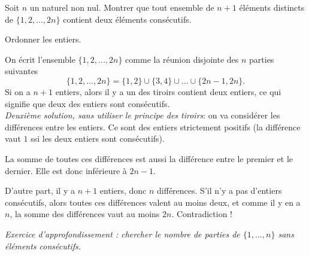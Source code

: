 \begin{exo}
Soit $n$ un naturel non nul. Montrer que tout ensemble de $n+1$ éléments distincts de $\{1,2,...,2n\}$ contient deux éléments consécutifs. 

\begin{hint}
Ordonner les entiers.
\end{hint}
\begin{sol}

On écrit l'ensemble $\{1,2,...,2n\}$ comme la réunion disjointe des $n$ parties suivantes
\[ \{1,2,...,2n\} = \{1,2 \} \cup \{3,4 \}\cup ... \cup \{2n-1,2n \}.\]
Si on a $n+1$ entiers, alors il y a un des \og tiroirs\fg{} contient deux entiers, ce qui signifie que deux des entiers sont consécutifs.\\

\emph{Deuxième solution, sans utiliser le principe des tiroirs}: on va considérer les différences entre les entiers. Ce sont des entiers strictement positifs (la différence vaut $1$ ssi les deux entiers sont consécutifs).

La somme de toutes ces différences est aussi la différence entre le premier et le dernier. Elle est donc inférieure à $2n-1$.

D'autre part, il y a $n+1$ entiers, donc $n$ différences. S'il n'y a pas d'entiers consécutifs, alors toutes ces différences valent au moins deux, et comme il y en a $n$, la somme des différences vaut au moins $2n$. Contradiction !

\emph{Exercice d'approfondissement : chercher le nombre de parties de $\{1, ..., n\}$ sans éléments consécutifs.}
\end{sol}
\end{exo}


